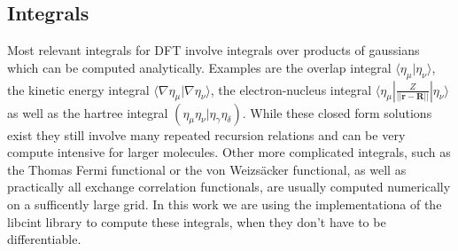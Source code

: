 \subsection{Integrals}
Most relevant integrals for DFT involve integrals over products of gaussians which can be computed analytically. Examples are the overlap integral $\langle \eta_{\mu}|\eta_{\nu}\rangle$, the kinetic energy integral $\langle \nabla \eta_{\mu}|\nabla \eta_{\nu}\rangle$, the electron-nucleus integral $\langle \eta_{\mu}|\frac{Z}{||\mathbf{r}-\mathbf{R}||}|\eta_{\nu}\rangle$ as well as the hartree integral $(\eta_{\mu}\eta_{\nu}|\eta_\gamma\eta_\delta)$. While these closed form solutions exist they still involve many repeated recursion relations and can be very compute intensive for larger molecules. Other more complicated integrals, such as the Thomas Fermi functional or the von Weizsäcker functional, as well as practically all exchange correlation functionals, are usually computed numerically on a sufficently large grid. In this work we are using the implementationa of the libcint library \cite{sun_libcint_2015} to compute these integrals, when they don't have to be differentiable.

